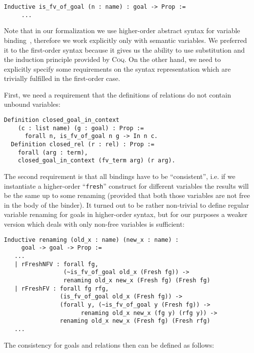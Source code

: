 \begin{lstlisting}[language=Coq]
   Inductive is_fv_of_goal (n : name) : goal -> Prop :=
     ...
\end{lstlisting}

Note that in our formalization we use higher-order abstract syntax for variable binding~\cite{HOAS}, therefore we work explicitly only with semantic variables.
We preferred it to the first-order syntax because it gives us the ability to use substitution and the induction principle provided by \textsc{Coq}.
On the other hand, we need to explicitly specify some requirements on the syntax representation which are trivially fulfilled in the first-order case.

First, we need a requirement that the definitions of relations do not contain unbound variables:

\begin{lstlisting}[language=Coq] 
  Definition closed_goal_in_context 
    (c : list name) (g : goal) : Prop :=
      forall n, is_fv_of_goal n g -> In n c.
  Definition closed_rel (r : rel) : Prop :=
    forall (arg : term),
    closed_goal_in_context (fv_term arg) (r arg).
\end{lstlisting}

The second requirement is that all bindings have to be ``consistent'', i.e. if we instantiate a higher-order ``\lstinline|fresh|''
construct for different variables the results will be the same up to some renaming (provided that both those variables are not free in
the body of the binder). It turned out to be rather non-trivial to define regular variable renaming for goals in higher-order syntax, but for our purposes
a weaker version which deals with only non-free variables is sufficient:

\begin{lstlisting}[language=Coq]
   Inductive renaming (old_x : name) (new_x : name) :
     goal -> goal -> Prop :=
   ...
   | rFreshNFV : forall fg,
                 (~is_fv_of_goal old_x (Fresh fg)) ->
                 renaming old_x new_x (Fresh fg) (Fresh fg)
   | rFreshFV : forall fg rfg,
                (is_fv_of_goal old_x (Fresh fg)) ->
                (forall y, (~is_fv_of_goal y (Fresh fg)) ->
                      renaming old_x new_x (fg y) (rfg y)) ->
                renaming old_x new_x (Fresh fg) (Fresh rfg)
   ...
\end{lstlisting}

The consistency for goals and relations then can be defined as follows:

